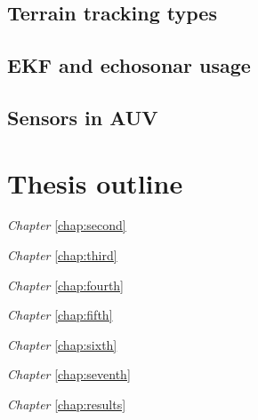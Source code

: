 \subsection{Terrain tracking types} %
\subsection{EKF and echosonar usage}
\subsection{Sensors in AUV} %

\section{Thesis outline}
\emph{Chapter} \ref{chap:second} 

\emph{Chapter} \ref{chap:third} 

\emph{Chapter} \ref{chap:fourth} 

\emph{Chapter} \ref{chap:fifth} 

\emph{Chapter} \ref{chap:sixth} 

\emph{Chapter} \ref{chap:seventh} 

\emph{Chapter} \ref{chap:results} 
